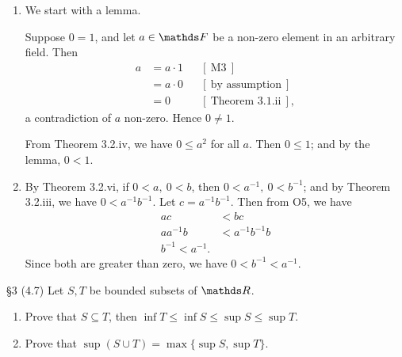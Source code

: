 \documentclass{homework}
\begin{document}
\begin{solution}
  \begin{enumerate}[label=(\alph*)]
    \item We start with a lemma.
      \begin{lemma}[$0\neq 1$]{}
        Suppose $0=1$, and let $a\in \F$ be a non-zero element in an arbitrary field. Then
        \begin{align*}
          a &= a\cdot 1 && [~\text{M3}~] \\
            &= a\cdot 0 &&[~\text{by assumption}~] \\
            &= 0 && [~\text{Theorem 3.1.ii}~]
        ,\end{align*}
        a contradiction of $a$ non-zero. Hence $0\neq 1$.
      \end{lemma}
      From Theorem 3.2.iv, we have  $0\le a^2$ for all $a$. Then $ 0\le 1$; and by the lemma, $0<1$.
      
    \item By Theorem 3.2.vi, if $0<a,\ 0<b$, then $0<a^{-1},\ 0<b^{-1}$; and by Theorem 3.2.iii, we
      have $0<a^{-1}b^{-1}$. Let $c=a^{-1}b^{-1}$. Then from O5, we have 
      \begin{align*}
        ac &< bc\\
        aa^{-1}b&<a^{-1}b^{-1}b\\
        b^{-1}<a^{-1}
      .\end{align*} Since both are greater than zero, we have $0<b^{-1}<a^{-1}$.
  \end{enumerate}
\end{solution}

\begin{problem}{\S 3}
  (4.7) Let $S,T$ be bounded subsets of $\R$.
  \begin{enumerate}[label=(\alph*)]
    \item Prove that $S\subseteq T$, then  $\inf T \le \inf S \le \sup S \le \sup T$.
    \item Prove that $\sup(S\cup T)=\max\{ \sup S,\sup T \}$.
  \end{enumerate}
\end{problem}
\end{document}
